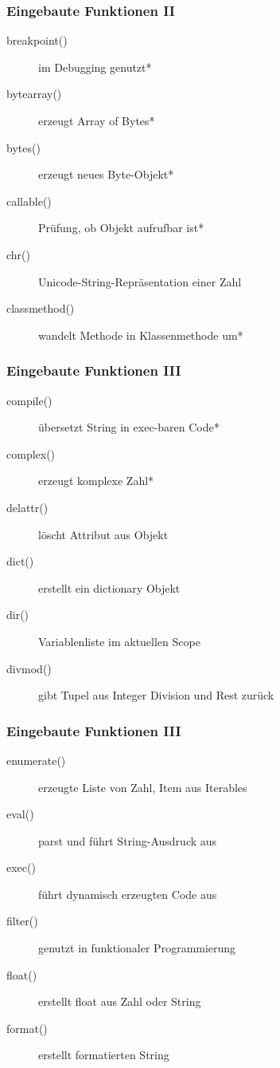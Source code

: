\documentclass[ngerman]{beamer}
\begin{document}
\begin{frame}
\frametitle{Eingebaute Funktionen II}

\begin{description}
\item[breakpoint()] im Debugging genutzt*
\item[bytearray()] erzeugt Array of Bytes*
\item[bytes()] erzeugt neues Byte-Objekt*
\item[callable()] Prüfung, ob Objekt aufrufbar ist*
\item[chr()] Unicode-String-Repräsentation einer Zahl
\item[classmethod()] wandelt Methode in Klassenmethode um*
\end{description}
\end{frame}


\begin{frame}
\frametitle{Eingebaute Funktionen III}

\begin{description}
\item[compile()] übersetzt String in exec-baren Code*
\item[complex()] erzeugt komplexe Zahl*
\item[delattr()] löscht Attribut aus Objekt
\item[dict()] erstellt ein dictionary Objekt
\item[dir()] Variablenliste im aktuellen Scope
\item[divmod()] gibt Tupel aus Integer Division und Rest zurück
\end{description}
\end{frame}


\begin{frame}
\frametitle{Eingebaute Funktionen III}

\begin{description}
\item[enumerate()] erzeugte Liste von Zahl, Item aus Iterables
\item[eval()] parst und führt String-Ausdruck aus
\item[exec()] führt dynamisch erzeugten Code aus
\item[filter()] genutzt in funktionaler Programmierung
\item[float()] erstellt float aus Zahl oder String
\item[format()] erstellt formatierten String
\end{description}
\end{frame}
\end{document}

